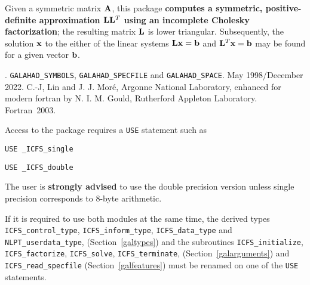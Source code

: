 \documentclass{galahad}
\newcommand{\packagename}{ICFS}
\newcommand{\fullpackagename}{\libraryname\_\packagename}
\begin{document}
\galheader


\galsummary
Given a symmetric matrix ${\mathbf{A}}$, this package 
{\bf computes a symmetric, positive-definite approximation 
${\mathbf{L}} {\mathbf{L}}^T$ using an incomplete Cholesky factorization}; the
resulting matrix ${\mathbf{L}}$ is lower triangular.
Subsequently, the solution ${\mathbf{x}}$ to the either of the linear systems
${\mathbf{L}} {\mathbf{x}} = {\mathbf{b}}$ and ${\mathbf{L}}^T {\mathbf{x}} = {\mathbf{b}}$
may be found for a given vector ${\mathbf{b}}$.


\galattributes
\galversions{\tt  \fullpackagename\_single, \fullpackagename\_double}.
\galuses 
{\tt GALAHAD\_SY\-M\-BOLS}, 
{\tt GALAH\-AD\-\_\-SP\-ECFILE} and
{\tt GALAHAD\_SPACE}.
\galdate May 1998/December 2022.
\galorigin C.-J, Lin and J. J. Mor\'{e}, Argonne National Laboratory,
enhanced for modern fortran by N. I. M. Gould, Rutherford Appleton Laboratory.
\gallanguage Fortran~2003. 


\galhowto


Access to the package requires a {\tt USE} statement such as

\medskip{}

\hspace{8mm} {\tt USE \fullpackagename\_single}

\medskip{}

\hspace{8mm} {\tt USE  \fullpackagename\_double}

\medskip

\noindent
The user is {\bf strongly advised} to use the double
precision version unless single precision corresponds to 8-byte arithmetic.

If it is required to use both modules at the same time, the derived types 
{\tt \packagename\_control\_type}, 
{\tt \packagename\_inform\_type},
{\tt \packagename\_data\_type}
and
{\tt NLPT\_userdata\_type},
(Section~\ref{galtypes})
and the subroutines
{\tt \packagename\_initialize}, 
{\tt \packagename\_\-factorize},
{\tt \packagename\_\-solve},
{\tt \packagename\_terminate},
(Section~\ref{galarguments})
and 
{\tt \packagename\_read\_specfile}
(Section~\ref{galfeatures})
must be renamed on one of the {\tt USE} statements.
\end{document}
